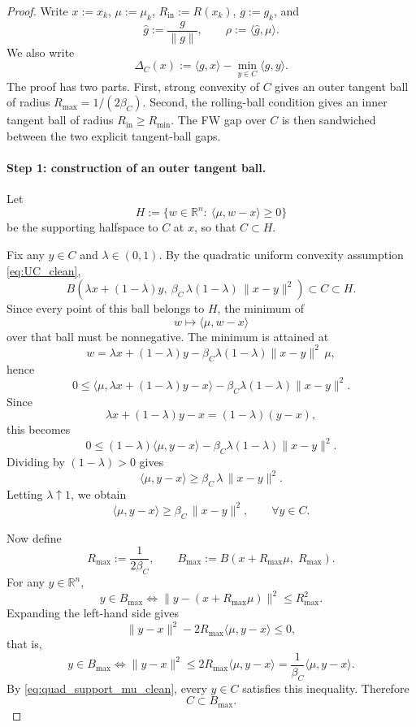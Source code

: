 \documentclass{article}
\begin{document}
\begin{proof}
Write $x:=x_k$, $\mu:=\mu_k$, $R_{\mathrm{in}}:=R(x_k)$, $g:=g_k$, and
\[
\hat g:=\frac{g}{\|g\|},
\qquad
\rho:=\langle \hat g,\mu\rangle.
\]
We also write
\[
\Delta_C(x):=\langle g,x\rangle-\min_{y\in C}\langle g,y\rangle.
\]
The proof has two parts. First, strong convexity of \(C\) gives an outer tangent
ball of radius \(R_{\max}=1/(2\beta_C)\). Second, the rolling-ball condition
gives an inner tangent ball of radius \(R_{\mathrm{in}}\ge R_{\min}\). The FW
gap over \(C\) is then sandwiched between the two explicit tangent-ball gaps.
\paragraph{Step 1: construction of an outer tangent ball.}
Let
\[
H:=\{w\in\mathbb R^n:\ \langle \mu,w-x\rangle\ge 0\}
\]
be the supporting halfspace to $C$ at $x$, so that $C\subset H$.

Fix any $y\in C$ and $\lambda\in(0,1)$. By the quadratic uniform convexity assumption \eqref{eq:UC_clean},
\[
B\!\left(\lambda x+(1-\lambda)y,\ \beta_C\,\lambda(1-\lambda)\,\|x-y\|^2\right)\subset C\subset H.
\]
Since every point of this ball belongs to $H$, the minimum of
\[
w\longmapsto \langle \mu,w-x\rangle
\]
over that ball must be nonnegative. The minimum is attained at
\[
w=\lambda x+(1-\lambda)y-\beta_C\lambda(1-\lambda)\|x-y\|^2\,\mu,
\]
hence
\[
0\le
\langle \mu,\lambda x+(1-\lambda)y-x\rangle
-\beta_C\lambda(1-\lambda)\|x-y\|^2.
\]
Since
\[
\lambda x+(1-\lambda)y-x=(1-\lambda)(y-x),
\]
this becomes
\[
0\le
(1-\lambda)\langle \mu,y-x\rangle
-\beta_C\lambda(1-\lambda)\|x-y\|^2.
\]
Dividing by $(1-\lambda)>0$ gives
\[
\langle \mu,y-x\rangle\ge \beta_C\,\lambda\,\|x-y\|^2.
\]
Letting $\lambda\uparrow 1$, we obtain
\begin{equation}
\langle \mu,y-x\rangle\ge \beta_C\,\|x-y\|^2,
\qquad \forall y\in C.
\label{eq:quad_support_mu_clean}
\end{equation}

Now define
\[
R_{\max}:=\frac{1}{2\beta_C},
\qquad
B_{\max}:=B(x+R_{\max}\mu,\;R_{\max}).
\]
For any $y\in\mathbb R^n$,
\[
y\in B_{\max}
\iff
\|y-(x+R_{\max}\mu)\|^2\le R_{\max}^2.
\]
Expanding the left-hand side gives
\[
\|y-x\|^2-2R_{\max}\langle \mu,y-x\rangle\le 0,
\]
that is,
\[
y\in B_{\max}
\iff
\|y-x\|^2\le 2R_{\max}\langle \mu,y-x\rangle
=
\frac{1}{\beta_C}\langle \mu,y-x\rangle.
\]
By \eqref{eq:quad_support_mu_clean}, every $y\in C$ satisfies this inequality. Therefore
\begin{equation}
C\subset B_{\max}.
\label{eq:outer_ball_mu_clean}
\end{equation}


\end{proof}
\end{document}
